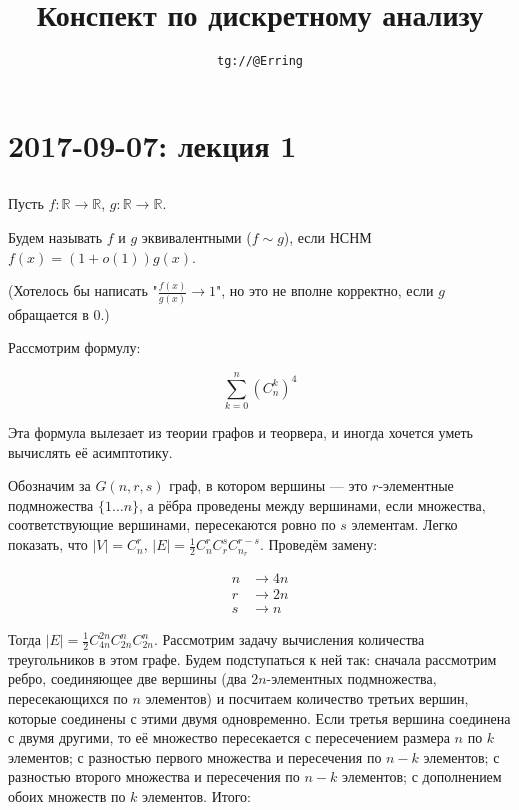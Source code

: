 \documentclass[12pt]{article}
\title{Конспект по дискретному анализу}
\author{\texttt{tg://@Erring}}
\begin{document}
\maketitle

\section{2017-09-07: лекция 1}

\subsection{}

Пусть $f \colon \mathbb R \to \mathbb R$, $g \colon \mathbb R \to \mathbb R$.

Будем называть $f$ и $g$ эквивалентными ($f \sim g$), если НСНМ $f(x) = (1 + o(1)) g(x)$.

(Хотелось бы написать "$\frac {f(x)} {g(x)} \to 1$", но это не вполне корректно, если $g$ обращается в $0$.)

Рассмотрим формулу:

\[
\sum_{k=0}^n \left( C^k_n \right)^4
\]

Эта формула вылезает из теории графов и теорвера, и иногда хочется уметь вычислять её асимптотику.

Обозначим за $G(n, r, s)$ граф, в котором вершины — это $r$-элементные подмножества $\{1 \ldots n\}$, а рёбра проведены между вершинами, если множества, соответствующие вершинами, пересекаются ровно по $s$ элементам. Легко показать, что $|V| = C^r_n$, $|E| = \frac 1 2 C^r_n  C^s_r C^{r - s}_{n_r}$. Проведём замену:

\begin{align*}
n &\to 4n \\
r &\to 2n \\
s &\to n
\end{align*}

Тогда $|E| = \frac 1 2 C^{2n}_{4n} C^n_{2n} C^n_{2n}$. Рассмотрим задачу вычисления количества треугольников в этом графе. Будем подступаться к ней так: сначала рассмотрим ребро, соединяющее две вершины (два $2n$-элементных подмножества, пересекающихся по $n$ элементов) и посчитаем количество третьих вершин, которые соединены с этими двумя одновременно. Если третья вершина соединена с двумя другими, то её множество пересекается с пересечением размера $n$ по $k$ элементов; с разностью первого множества и пересечения по $n-k$ элементов; с разностью второго множества и пересечения по $n-k$ элементов; с дополнением обоих множеств по $k$ элементов. Итого:
\end{document}
